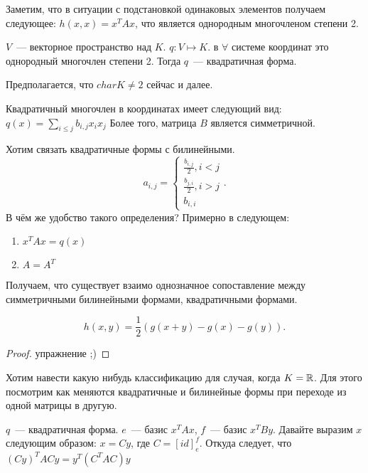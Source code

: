 \begin{remark}
    Заметим, что в ситуации с подстановкой одинаковых элементов получаем следующее:
    $h(x,x) = x^TAx$, что является однородным многочленом степени 2.
\end{remark}
\begin{definition}
    $V$~--- векторное пространство над $K$. $q\colon V\mapsto K$. 
    в $\forall$ системе координат это однородный многочлен степени 2.
    Тогда $q$~--- квадратичная форма.
\end{definition}
\begin{remark}
    Предполагается, что $char K \not= 2$ сейчас и далее.
\end{remark}
\begin{remark}
    Квадратичный многочлен в координатах имеет следующий вид:
    $q(x) = \sum\limits_{i\le j}^{}{b_{i,j} x_i x_j}$
    Более того, матрица $B$ является симметричной.
\end{remark}
\begin{remark}
    Хотим связать квадратичные формы с билинейными.
     \[
     a_{i,j} = 
     \begin{cases}
         \frac{b_{i,j}}{2}, i < j\\
         \frac{b_{j,i}}{2}, i > j\\
         b_{i,i}
     \end{cases}
    .\] 
    В чём же удобство такого определения? Примерно в следующем:
    \begin{enumerate}
        \item
            $x^TAx = q(x)$
        \item
             $A = A^T$
    \end{enumerate}
    Получаем, что существует взаимо однозначное сопоставление между
    симметричными билинейными формами, квадратичными формами.
\end{remark}
\begin{statement}
     \[
    h(x, y) = \frac{1}{2}(g(x + y) - g(x) - g(y))
    .\] 
\end{statement}
\begin{proof}
    упражнение ;)
\end{proof}
\begin{motivation}
    Хотим навести какую нибудь классификацию для случая, когда $K = \mathbb{R}$.
    Для этого посмотрим как меняются квадратичные и билинейные формы при переходе из одной матрицы в другую.
\end{motivation}
\begin{statement}
    $q$~--- квадратичная форма. $e$~--- базис $x^TAx$, $f$~--- базис $x^TBy$.
    Давайте выразим $x$ следующим образом: $x = Cy$, где $C = [id]^f_e$.
    Откуда следует, что $(Cy)^TACy = y^T(C^TAC)y$
\end{statement}

